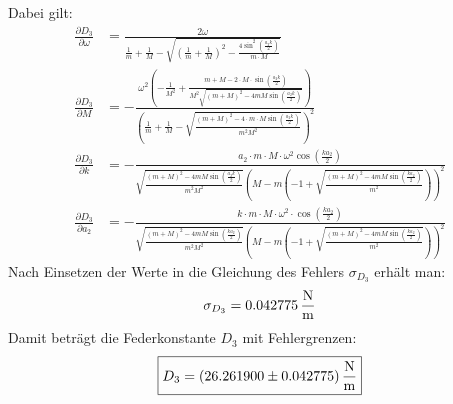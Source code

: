 \documentclass[a4paper,titlepage]{scrartcl}
\numberwithin{equation}{section}
\begin{document}
Dabei gilt:
\begin{align*}
\frac{\partial D_3}{\partial \omega}&=\frac{2 \omega}{\frac{1}{m}+\frac{1}{M}-\sqrt{\left( \frac{1}{m} + \frac{1}{M} \right)^2 - \frac{4 \sin^2{\left( \frac{a_2 k}{2} \right)}}{m \cdot M}}}\\
\frac{\partial D_3}{\partial M}&=-\frac{\omega^2 \left( -\frac{1}{M^2} + \frac{m+M-2 \cdot M \cdot \sin{\left( \frac{a_2 k}{2} \right)}}{M^2 \sqrt{(m+M)^2-4mM \sin{\left( \frac{a_2 k}{2} \right)}}} \right)}{\left( \frac{1}{m} + \frac{1}{M} - \sqrt{\frac{(m+M)^2- 4 \cdot m \cdot M \sin{\left( \frac{a_2 k}{2} \right)}}{m^2 M^2}} \right)^2}\\
\frac{\partial D_3}{\partial k}&=-\frac{a_2 \cdot m \cdot M \cdot \omega^2 \cos{\left( \frac{k a_2}{2} \right)}}{\sqrt{\frac{(m + M)^2-4 m M \sin{\left( \frac{a_2 k}{2} \right)}}{m^2 M^2}} \left( M-m\left( -1 + \sqrt{\frac{(m+M)^2-4mM \sin{\left( \frac{k a_2}{2} \right)}}{m^2}} \right) \right)^2}\\
\frac{\partial D_3}{\partial a_2}&=-\frac{k \cdot m \cdot M \cdot \omega^2 \cdot \cos{\left( \frac{k a_2}{2} \right)}}{\sqrt{\frac{(m+M)^2-4mM \sin{\left( \frac{k a_2}{2} \right)}}{m^2 M^2}} \left( M-m\left( -1 + \sqrt{\frac{(m+M)^2-4mM \sin{\left( \frac{k a_2}{2} \right)}}{m^2}} \right) \right)^2}
\end{align*}
Nach Einsetzen der Werte in die Gleichung des Fehlers $\sigma_{D_3}$ erhält man:
\begin{equation*}
\sigma_{D_3}=\unit[0.042775]{\frac{N}{m}}
\end{equation*}
Damit beträgt die Federkonstante $D_3$ mit Fehlergrenzen:
\begin{equation*}
\boxed{D_3=\unit[(26.261900 \pm 0.042775)]{\frac{N}{m}}}
\end{equation*}
\end{document}
